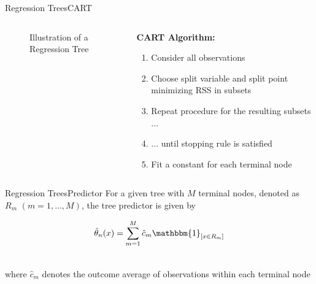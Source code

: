 \documentclass{beamer}
\begin{document}
\begin{frame}{Regression Trees}{CART}

\begin{columns}[T]
    \begin{column}{5cm}
    \begin{figure}
\caption{Illustration of a Regression Tree}
\end{figure}

    \end{column}


    \begin{column}{5cm}
		\textbf{CART Algorithm:}
        \begin{enumerate}
        	\item <1-> Consider all observations
			\item <2-> Choose split variable and split point minimizing RSS in 					  subsets
			\item <3-> Repeat procedure for the resulting subsets ...
			\item <4-> ... until stopping rule is satisfied
            \item <5-> Fit a constant for each terminal node
		\end{enumerate}
	\end{column}


\end{columns}

\end{frame}



\begin{frame}{Regression Trees}{Predictor}
For a given tree with $M$ terminal nodes, denoted as $R_m $ $(m= 1, \dots, M)$, the tree predictor is given by

$$\hat{\theta}_{n}(x)=\sum\limits_{m=1}^{M}\hat{c}_m\mathbbm{1}_{[x\in R_m]}$$

\ \\
where $\hat{c}_m$ denotes the outcome average of observations within each terminal node

\ \\

\end{frame}
\end{document}
